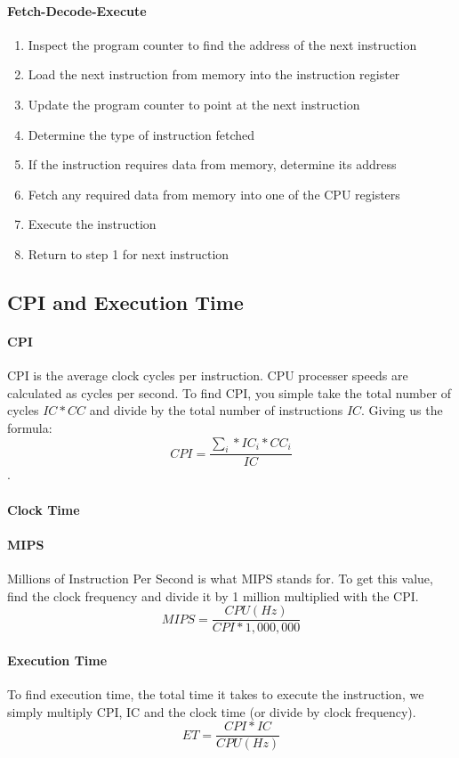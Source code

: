 \paragraph{Fetch-Decode-Execute}
\begin{enumerate}
	\item Inspect the program counter to find the address of the next instruction
	\item Load the next instruction from memory into the instruction register
	\item Update the program counter to point at the next instruction
	\item Determine the type of instruction fetched
	\item If the instruction requires data from memory, determine its address
	\item Fetch any required data from memory into one of the CPU registers
	\item Execute the instruction
	\item Return to step 1 for next instruction
\end{enumerate}

\subsection{CPI and Execution Time}
\paragraph{CPI} CPI is the average clock cycles per instruction. CPU processer speeds are calculated as cycles per second. To find CPI, you simple take the total number of cycles $IC*CC$ and divide by the total number of instructions $IC$. Giving us the formula: \[CPI = \frac{\sum_{i}*IC_i*CC_i}{IC}\].
\paragraph{Clock Time} 
\paragraph{MIPS} Millions of Instruction Per Second is what MIPS stands for. To get this value, find the clock frequency and divide it by 1 million multiplied with the CPI. \[MIPS = \frac{CPU (Hz)}{CPI*1,000,000}\]
\paragraph{Execution Time} To find execution time, the total time it takes to execute the instruction, we simply multiply CPI, IC and the clock time (or divide by clock frequency). \[ET = \frac{CPI *IC}{CPU (Hz)}\]
